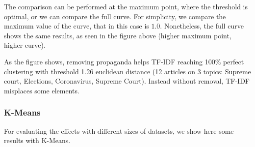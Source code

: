The comparison can be performed at the maximum point, where the threshold is optimal, %
or we can compare the full curve. For simplicity, we compare the maximum value of the curve, that in this case is $1.0$.
Nonetheless, the full curve shows the same results, as seen in the figure above (higher maximum point, higher curve).

As the figure shows, removing propaganda helps TF-IDF reaching 100\% perfect clustering with threshold 1.26 euclidean distance (12 articles on 3 topics: Supreme court, Elections, Coronavirus, Supreme Court). Instead without removal, TF-IDF misplaces some elements.


\subsubsection{K-Means}
For evaluating the effects with different sizes of datasets, we show here some results with K-Means.

